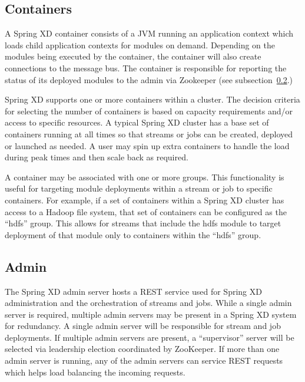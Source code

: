 \subsection{Containers}
A Spring XD container consists of a JVM running an application context which
loads child application contexts for modules on demand. Depending on the modules
being executed by the container, the container will also create connections to
the message bus. The container is responsible for reporting the status of its deployed
modules to the admin via Zookeeper (see subsection~\ref{subsec:Admin}.)

Spring XD supports one or more containers within a cluster. The decision criteria
for selecting the number of containers is based on capacity requirements and/or access
to specific resources.  A typical Spring XD cluster has a base set of containers
running at all times so that streams or jobs can be created, deployed or launched
as needed. A user may spin up extra containers to handle the load during peak times
and then scale back as required.

A container may be associated with one or more groups. This functionality is useful
for targeting module deployments within a stream or job to specific containers.
For example, if a set of containers within a Spring XD cluster has access to
a Hadoop\cite{hadoop} file system, that set of containers can be configured as the ``hdfs'' group.
This allows for streams that include the hdfs module to target deployment of
that module only to containers within the ``hdfs'' group.

\subsection{Admin}
\label{subsec:Admin}
The Spring XD admin server hosts a REST service used for Spring XD
administration and the orchestration of streams and jobs. While a single
admin server is required, multiple admin servers may be present in a Spring XD
system for redundancy. A single admin server will be responsible for stream
and job deployments. If multiple admin servers are present, a ``supervisor''
server will be selected via leadership election coordinated by ZooKeeper.
If more than one admin server is running, any of the admin servers
can service REST requests which helps load balancing the incoming requests.


